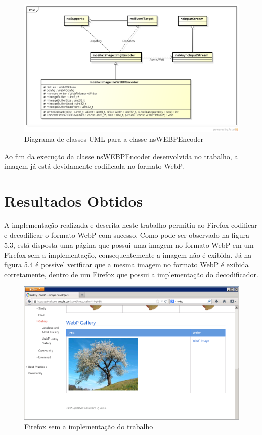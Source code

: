 \documentclass[espaco=simples,appendix=Name]{abnt}
\begin{document}
\begin{figure}[h]
  \centering
    \includegraphics[scale=0.4]{nsWEBPEncoder_UML.png}
  \caption{Diagrama de classes UML para a classe nsWEBPEncoder}
\end{figure}

Ao fim da execução da classe nsWEBPEncoder desenvolvida no trabalho, a imagem já está devidamente codificada no formato WebP.
\newpage
\section{Resultados Obtidos}

A implementação realizada e descrita neste trabalho permitiu ao Firefox codificar e decodificar o formato WebP com sucesso. Como pode ser observado na figura 5.3, está disposta uma página que possui uma imagem no formato WebP em um Firefox sem a implementação, consequentemente a imagem não é exibida. Já na figura 5.4 é possível verificar que a mesma imagem no formato WebP é exibida corretamente, dentro de um Firefox que possui a implementação do decodificador. 

\begin{figure}[h]
  \centering
    \includegraphics[scale=0.3]{FirefoxSemWebP.png}
  \caption{Firefox sem a implementação do trabalho}
\end{figure}
\end{document}
